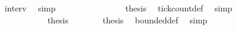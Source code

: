 \begin{isabellebody}
\ \ \ \ \ \ \ \ \ \ \ \ \ \ \ \ \isamarkupfalse%
\ interv{\isacharunderscore}{}\ \isamarkupfalse%
\ simp\isanewline
\ \ \ \ \ \ \ \ \ \ \ \ \ \ \isamarkupfalse%
\ {\isacharquery}thesis\ \isamarkupfalse%
\ tick{\isacharunderscore}count{\isacharunderscore}def\ \isamarkupfalse%
\ simp\isanewline
\ \ \ \ \ \ \ \ \ \ \isamarkupfalse%
\isanewline
\ \ \ \ \ \ \isamarkupfalse%
\isanewline
\ \ \ \ \isacommand{{\isacharbraceright}}\isamarkupfalse%
\isanewline
\ \ \ \ \isamarkupfalse%
\ {\isacharquery}thesis\ \isacommand{{\isachardot}{\isachardot}}\isamarkupfalse%
\isanewline
\ \ \isamarkupfalse%
\isanewline
\ \ \isamarkupfalse%
\ {\isacharquery}thesis\ \isamarkupfalse%
\ bounded{\isacharunderscore}def\ \isamarkupfalse%
\ simp\isanewline
{}\isamarkupfalse%
%
\endisatagproof
{\isafoldproof}%
%
\isadelimproof
\isanewline
%
\endisadelimproof
%
\isadelimtheory
\isanewline
%
\endisadelimtheory
%
\isatagtheory
{}\isamarkupfalse%
%
\endisatagtheory
{\isafoldtheory}%
%
\isadelimtheory
%
\endisadelimtheory
%
\end{isabellebody}%
\endinput
